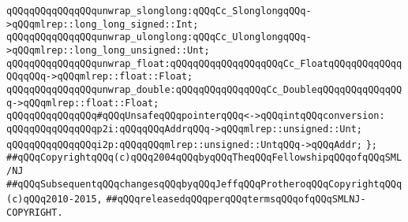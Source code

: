 \newline
\verb|qQQqqQQqqQQqqQQqunwrap_slonglong:qQQqCc_SlonglongqQQq->qQQqmlrep::long_long_signed::Int;|\newline
\verb|qQQqqQQqqQQqqQQqunwrap_ulonglong:qQQqCc_UlonglongqQQq->qQQqmlrep::long_long_unsigned::Unt;|\newline
\newline
\verb|qQQqqQQqqQQqqQQqunwrap_float:qQQqqQQqqQQqqQQqqQQqCc_FloatqQQqqQQqqQQqqQQqqQQq->qQQqmlrep::float::Float;|\newline
\verb|qQQqqQQqqQQqqQQqunwrap_double:qQQqqQQqqQQqqQQqCc_DoubleqQQqqQQqqQQqqQQq->qQQqmlrep::float::Float;|\newline
\newline
\verb|qQQqqQQqqQQqqQQq#qQQqUnsafeqQQqpointerqQQq<->qQQqintqQQqconversion:|\newline
\verb|qQQqqQQqqQQqqQQqp2i:qQQqqQQqAddrqQQq->qQQqmlrep::unsigned::Unt;|\newline
\verb|qQQqqQQqqQQqqQQqi2p:qQQqqQQqmlrep::unsigned::UntqQQq->qQQqAddr;|\newline
\verb|};|\newline
\newline
\newline
\verb|##qQQqCopyrightqQQq(c)qQQq2004qQQqbyqQQqTheqQQqFellowshipqQQqofqQQqSML/NJ|\newline
\verb|##qQQqSubsequentqQQqchangesqQQqbyqQQqJeffqQQqProtheroqQQqCopyrightqQQq(c)qQQq2010-2015,|\newline
\verb|##qQQqreleasedqQQqperqQQqtermsqQQqofqQQqSMLNJ-COPYRIGHT.|\newline

